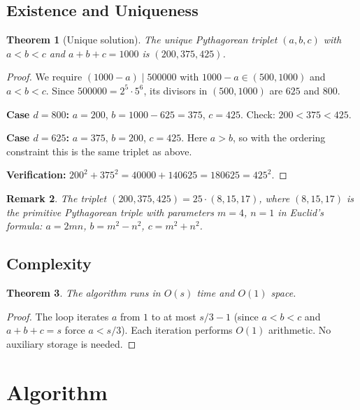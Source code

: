 \documentclass[11pt]{article}
\newtheorem{theorem}{Theorem}
\newtheorem{remark}[theorem]{Remark}
\begin{document}
\subsection{Existence and Uniqueness}

\begin{theorem}[Unique solution]\label{thm:unique}
The unique Pythagorean triplet $(a,b,c)$ with $a < b < c$ and $a+b+c=1000$ is $(200, 375, 425)$.
\end{theorem}

\begin{proof}
We require $(1000 - a) \mid 500000$ with $1000 - a \in (500, 1000)$ and $a < b < c$. Since $500000 = 2^5 \cdot 5^6$, its divisors in $(500, 1000)$ are $625$ and $800$.

\textbf{Case $d = 800$:} $a = 200$, $b = 1000 - 625 = 375$, $c = 425$. Check: $200 < 375 < 425$.

\textbf{Case $d = 625$:} $a = 375$, $b = 200$, $c = 425$. Here $a > b$, so with the ordering constraint this is the same triplet as above.

\textbf{Verification:} $200^2 + 375^2 = 40000 + 140625 = 180625 = 425^2$. \checkmark
\end{proof}

\begin{remark}
The triplet $(200, 375, 425) = 25 \cdot (8, 15, 17)$, where $(8, 15, 17)$ is the primitive Pythagorean triple with parameters $m = 4$, $n = 1$ in Euclid's formula: $a = 2mn$, $b = m^2 - n^2$, $c = m^2 + n^2$.
\end{remark}

\subsection{Complexity}

\begin{theorem}
The algorithm runs in $O(s)$ time and $O(1)$ space.
\end{theorem}

\begin{proof}
The loop iterates $a$ from $1$ to at most $s/3 - 1$ (since $a < b < c$ and $a+b+c = s$ force $a < s/3$). Each iteration performs $O(1)$ arithmetic. No auxiliary storage is needed.
\end{proof}

\section{Algorithm}
\end{document}
